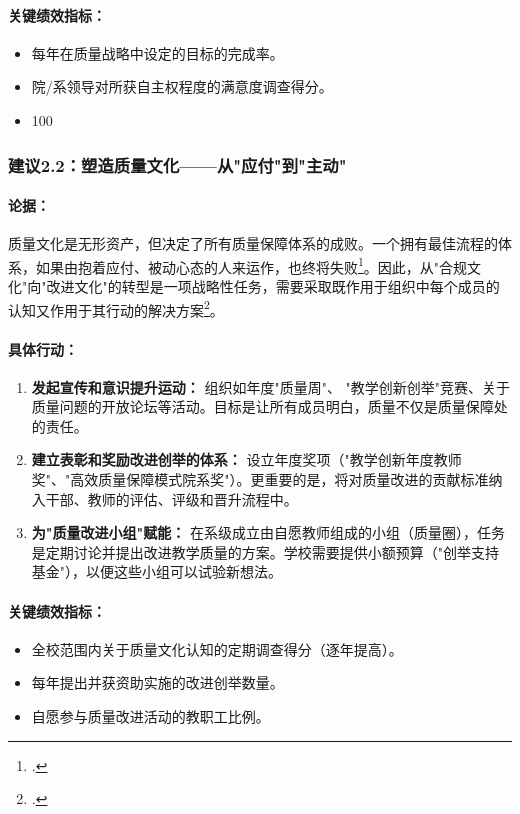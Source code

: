 \paragraph{关键绩效指标：}
\begin{itemize}
    \item 每年在质量战略中设定的目标的完成率。
    \item 院/系领导对所获自主权程度的满意度调查得分。
    \item 100%
\end{itemize}

\subsubsection{建议2.2：塑造质量文化——从"应付"到"主动"}

\paragraph{论据：}
质量文化是无形资产，但决定了所有质量保障体系的成败。一个拥有最佳流程的体系，如果由抱着应付、被动心态的人来运作，也终将失败\footcite{iosr_passiveparticipation}。因此，从"合规文化"向"改进文化"的转型是一项战略性任务，需要采取既作用于组织中每个成员的认知又作用于其行动的解决方案\footcite{HarveyStensaker2008}。

\paragraph{具体行动：}
\begin{enumerate}
    \item \textbf{发起宣传和意识提升运动：} 组织如年度"质量周"、 "教学创新创举"竞赛、关于质量问题的开放论坛等活动。目标是让所有成员明白，质量不仅是质量保障处的责任。
    \item \textbf{建立表彰和奖励改进创举的体系：} 设立年度奖项（"教学创新年度教师奖"、"高效质量保障模式院系奖"）。更重要的是，将对质量改进的贡献标准纳入干部、教师的评估、评级和晋升流程中。
    \item \textbf{为"质量改进小组"赋能：} 在系级成立由自愿教师组成的小组（质量圈），任务是定期讨论并提出改进教学质量的方案。学校需要提供小额预算（"创举支持基金"），以便这些小组可以试验新想法。
\end{enumerate}

\paragraph{关键绩效指标：}
\begin{itemize}
    \item 全校范围内关于质量文化认知的定期调查得分（逐年提高）。
    \item 每年提出并获资助实施的改进创举数量。
    \item 自愿参与质量改进活动的教职工比例。
\end{itemize}


